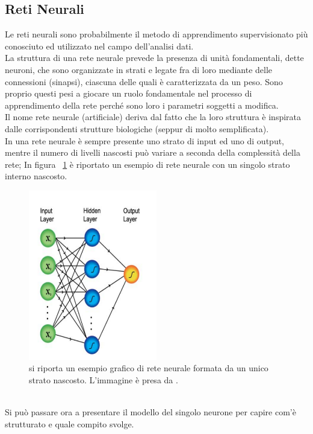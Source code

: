 \subsection{Reti Neurali}
\label{reti neurali}
Le reti neurali sono probabilmente il metodo di apprendimento supervisionato più conosciuto ed utilizzato nel campo dell'analisi dati. \\
La struttura di una rete neurale prevede la presenza di unità fondamentali, dette neuroni, che sono organizzate in strati e legate fra di loro mediante delle connessioni (sinapsi), ciascuna delle quali è caratterizzata da un peso. Sono proprio questi pesi a giocare un ruolo fondamentale nel processo di apprendimento della rete perché sono loro i parametri soggetti a modifica.\\
Il nome rete neurale (artificiale) deriva dal fatto che la loro struttura è inspirata dalle corrispondenti strutture biologiche (seppur di molto semplificata). \\
In una rete neurale è sempre presente uno strato di input ed uno di output, mentre il numero di livelli nascosti può variare a seconda della complessità della rete; In figura ~\ref{fig:schemaNN} è riportato un esempio di rete neurale con un singolo strato interno nascosto.
\begin{figure}[h!]
	\centering
	\includegraphics[width=0.50\textwidth]{figs/schemaNN.png}
	\caption{si riporta un esempio grafico di rete neurale formata da un unico strato nascosto. L'immagine è presa da \cite{Metodi_multivariati}.}
	\label{fig:schemaNN}
\end{figure}
\\
Si può passare ora a presentare il modello del singolo neurone per capire com'è strutturato e quale compito svolge.
